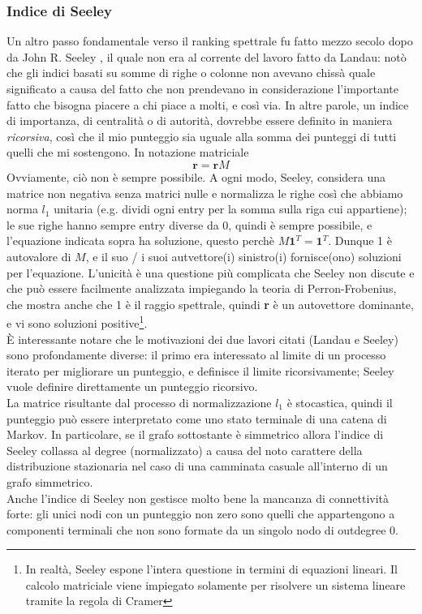 \subsubsection{Indice di Seeley}
Un altro passo fondamentale verso il ranking spettrale fu fatto mezzo secolo dopo da John R. Seeley %
, il quale non era al corrente del lavoro fatto da Landau: notò che gli indici basati su somme di righe o colonne non avevano chissà quale significato a causa del fatto che non prendevano in considerazione l'importante fatto che bisogna piacere a chi piace a molti, e così via. In altre parole, un indice di importanza, di centralità o di autorità, dovrebbe essere definito in maniera \textit{ricorsiva}, così che il mio punteggio sia uguale alla somma dei punteggi di tutti quelli che mi sostengono. In notazione matriciale
\begin{equation*}
    \textbf{r} = \textbf{r}M
\end{equation*}
Ovviamente, ciò non è sempre possibile. A ogni modo, Seeley, considera una matrice non negativa senza matrici nulle e normalizza le righe così che abbiamo norma $l_1$ unitaria (e.g. dividi ogni entry per la somma sulla riga cui appartiene); le sue righe hanno sempre entry diverse da 0, quindi è sempre possibile, e l'equazione indicata sopra ha soluzione, questo perchè $M\textbf{1}^T = \textbf{1}^T$. Dunque 1 è autovalore di $M$, e il suo / i suoi autvettore(i) sinistro(i) fornisce(ono) soluzioni per l'equazione. L'unicità è una questione più complicata che Seeley non discute e che può essere facilmente analizzata impiegando la teoria di Perron-Frobenius, che mostra anche che 1 è il raggio spettrale, quindi \textbf{r} è  un autovettore dominante, e vi sono soluzioni positive\footnote{In realtà, Seeley espone l'intera questione in termini di equazioni lineari. Il calcolo matriciale viene impiegato solamente per risolvere un sistema lineare tramite la regola di Cramer}.\\
È interessante notare che le motivazioni dei due lavori citati (Landau e Seeley) sono profondamente diverse: il primo era interessato al limite di un processo iterato per migliorare un punteggio, e definisce il limite ricorsivamente; Seeley vuole definire direttamente un punteggio ricorsivo.\\
La matrice risultante dal processo di normalizzazione $l_1$ è stocastica, quindi il punteggio può essere interpretato come uno stato terminale di una catena di Markov. In particolare, se il grafo sottostante è simmetrico allora l'indice di Seeley collassa al degree (normalizzato) a causa del noto carattere della distribuzione stazionaria nel caso di una camminata casuale all'interno di un grafo simmetrico.\\
Anche l'indice di Seeley non gestisce molto bene la mancanza di connettività forte: gli unici nodi con un punteggio non zero sono quelli che appartengono a componenti terminali che non sono formate da un singolo nodo di outdegree 0.
